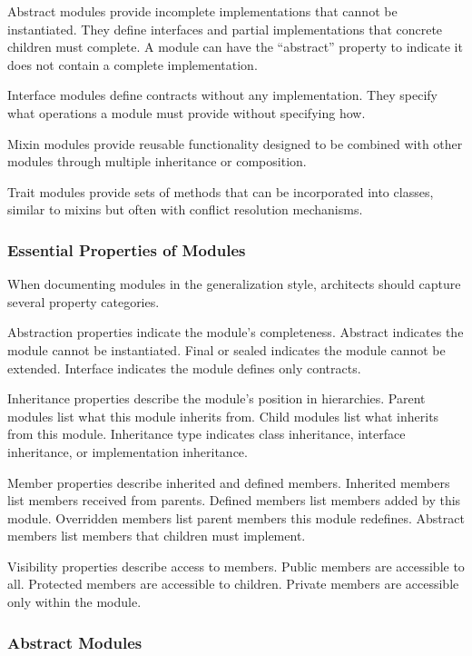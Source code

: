 \documentclass[11pt]{article}
\begin{document}
Abstract modules provide incomplete implementations that cannot be instantiated. They define interfaces and partial implementations that concrete children must complete. A module can have the ``abstract'' property to indicate it does not contain a complete implementation.

Interface modules define contracts without any implementation. They specify what operations a module must provide without specifying how.

Mixin modules provide reusable functionality designed to be combined with other modules through multiple inheritance or composition.

Trait modules provide sets of methods that can be incorporated into classes, similar to mixins but often with conflict resolution mechanisms.

\subsubsection{Essential Properties of Modules}

When documenting modules in the generalization style, architects should capture several property categories.

Abstraction properties indicate the module's completeness. Abstract indicates the module cannot be instantiated. Final or sealed indicates the module cannot be extended. Interface indicates the module defines only contracts.

Inheritance properties describe the module's position in hierarchies. Parent modules list what this module inherits from. Child modules list what inherits from this module. Inheritance type indicates class inheritance, interface inheritance, or implementation inheritance.

Member properties describe inherited and defined members. Inherited members list members received from parents. Defined members list members added by this module. Overridden members list parent members this module redefines. Abstract members list members that children must implement.

Visibility properties describe access to members. Public members are accessible to all. Protected members are accessible to children. Private members are accessible only within the module.

\subsubsection{Abstract Modules}
\end{document}
